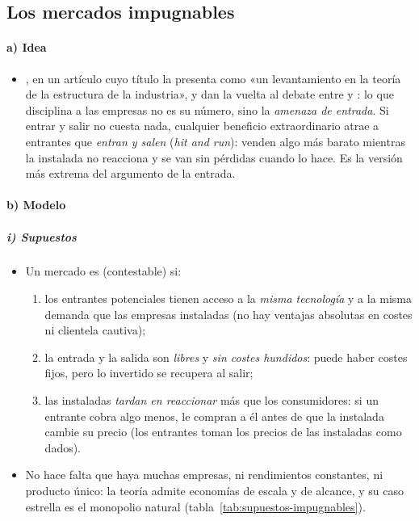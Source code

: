 \documentclass[11pt]{article}
\begin{document}
\subsection{Los mercados impugnables}\label{sec:impugnables}

\paragraph{a) Idea}

\begin{itemize}
\item \textcite{Baumol1982Contestable}, en un artículo cuyo título la presenta como «un levantamiento en la teoría de la estructura de la industria», y \textcite{BaumolPanzarWillig1982Contestable} dan la vuelta al debate entre  y : lo que disciplina a las empresas no es su número, sino la \emph{amenaza de entrada}. Si entrar y salir no cuesta nada, cualquier beneficio extraordinario atrae a entrantes que \emph{entran y salen} (\emph{hit and run}): venden algo más barato mientras la instalada no reacciona y se van sin pérdidas cuando lo hace. Es la versión más extrema del argumento de la entrada.
\end{itemize}

\paragraph{b) Modelo}

\subparagraph{i) Supuestos}

\begin{itemize}
\item Un mercado es  (contestable) si:
  \begin{enumerate}
  \item los entrantes potenciales tienen acceso a la \emph{misma tecnología} y a la misma demanda que las empresas instaladas (no hay ventajas absolutas en costes ni clientela cautiva);
  \item la entrada y la salida son \emph{libres} y \emph{sin costes hundidos}: puede haber costes fijos, pero lo invertido se recupera al salir;
  \item las instaladas \emph{tardan en reaccionar} más que los consumidores: si un entrante cobra algo menos, le compran a él antes de que la instalada cambie su precio (los entrantes toman los precios de las instaladas como dados).
  \end{enumerate}
\item No hace falta que haya muchas empresas, ni rendimientos constantes, ni producto único: la teoría admite economías de escala y de alcance, y su caso estrella es el monopolio natural (tabla~\ref{tab:supuestos-impugnables}).
\end{itemize}
\end{document}
